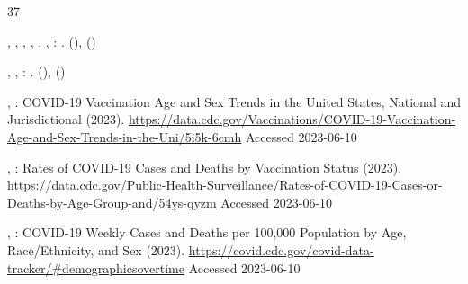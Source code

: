 \documentclass[sn-mathphys,Numbered]{sn-jnl}
\begin{document}
\begin{thebibliography}{37}
\begin{barticle}
,
,
,
,
,
,
:
.
(),
()
\end{barticle}
\endbibitem

\begin{barticle}
,
,
:
.
(),
()
\end{barticle}
\endbibitem

\begin{botherref}
,
:
COVID-19 Vaccination Age and Sex Trends in the United States, National and
  Jurisdictional
(2023).
\url{https://data.cdc.gov/Vaccinations/COVID-19-Vaccination-Age-and-Sex-Trends-in-the-Uni/5i5k-6cmh}
Accessed 2023-06-10
\end{botherref}
\endbibitem

\begin{botherref}
,
:
Rates of COVID-19 Cases and Deaths by Vaccination Status
(2023).
\url{https://data.cdc.gov/Public-Health-Surveillance/Rates-of-COVID-19-Cases-or-Deaths-by-Age-Group-and/54ys-qyzm}
Accessed 2023-06-10
\end{botherref}
\endbibitem

\begin{botherref}
,
:
COVID-19 Weekly Cases and Deaths per 100,000 Population by Age, Race/Ethnicity,
  and Sex
(2023).
\url{https://covid.cdc.gov/covid-data-tracker/#demographicsovertime}
Accessed 2023-06-10
\end{botherref}
\endbibitem


\end{thebibliography}
\end{document}
